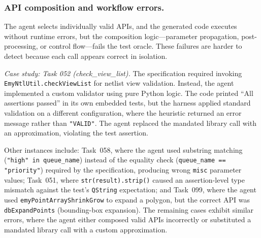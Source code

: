 \subsubsection{API composition and workflow errors.}

The agent selects individually valid APIs, and the generated code executes without runtime errors, but the composition logic---parameter propagation, post-processing, or control flow---fails the test oracle. These failures are harder to detect because each call appears correct in isolation.

\textit{Case study: Task 052 (check\_view\_list).} The specification required invoking \texttt{EmyNtlUtil.checkViewList} for netlist view validation. Instead, the agent implemented a custom validator using pure Python logic. The code printed ``All assertions passed'' in its own embedded tests, but the harness applied standard validation on a different configuration, where the heuristic returned an error message rather than \texttt{"VALID"}. The agent replaced the mandated library call with an approximation, violating the test assertion.

Other instances include: Task~058, where the agent used substring matching (\texttt{"high" in queue\_name}) instead of the equality check (\texttt{queue\_name == "priority"}) required by the specification, producing wrong \texttt{misc} parameter values; Task~051, where \texttt{str(result).strip()} caused an assertion-level type mismatch against the test's \texttt{QString} expectation; and Task~099, where the agent used \texttt{emyPointArrayShrinkGrow} to 
expand a polygon, but the correct API was \texttt{dbExpandPoints} (bounding-box 
expansion). The remaining cases exhibit similar errors, where the agent either 
composed valid APIs incorrectly or substituted a mandated library call with 
a custom approximation.


